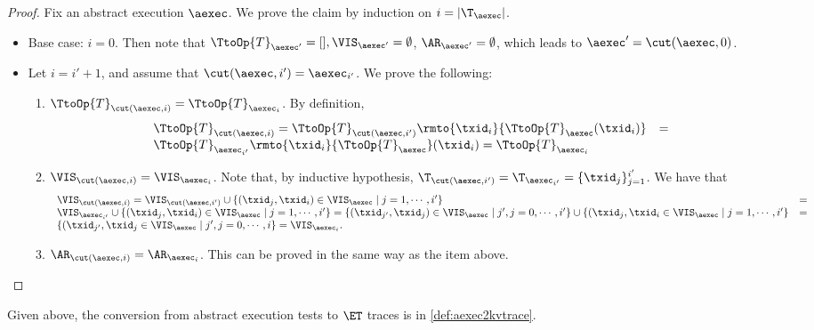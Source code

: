 \begin{proof}
Fix an abstract execution $\aexec$. We prove the claim by induction on $i = \lvert \T_{\aexec} \rvert$.
\begin{itemize}
\item Base case: $i = 0$. Then note that $\TtoOp{T}_{\aexec'} = [], \VIS_{\aexec'} = \emptyset$, 
$\AR_{\aexec'} = \emptyset$, which leads to $\aexec' = \cut(\aexec, 0)$. 
\item Let $i = i' + 1$, and assume that $\cut(\aexec, i') = \aexec_{i'}$. 
We prove the following: 
\begin{enumerate}
\item $\TtoOp{T}_{\cut(\aexec, i)} = \TtoOp{T}_{\aexec_i}$. 
By definition, 
\[
\begin{array}{lr}
\TtoOp{T}_{\cut(\aexec,i)} = \TtoOp{T}_{\cut(\aexec, i')}\rmto{\txid_{i}}{\TtoOp{T}_{\aexec}(\txid_{i})} &= \\
\TtoOp{T}_{\aexec_{i'}}\rmto{\txid_{i}}{\TtoOp{T}_{\aexec}}(\txid_{i}) = \TtoOp{T}_{\aexec_{i}}
\end{array}
\]
\item $\VIS_{\cut(\aexec, i)} = \VIS_{\aexec_{i}}$. 
Note that, by inductive hypothesis, $\T_{\cut(\aexec, i')} = \T_{\aexec_{i'}} = \{\txid_{j}\}_{j=1}^{i'}$. 
We have that  
\[
\begin{array}{lr}
\VIS_{\cut(\aexec, i)} = \VIS_{\cut(\aexec, i')} \cup \{(\txid_j, \txid_{i}) \in \VIS_{\aexec} \mid j = 1,\cdots, i'\} &= \\
\VIS_{\aexec_{i'}} \cup \{(\txid_{j}, \txid_{i}) \in \VIS_{\aexec} \mid j=1,\cdots, i'\} = 
\{(\txid_{j'}, \txid_{j}) \in \VIS_{\aexec} \mid j', j = 0,\cdots, i'\} \cup \{(\txid_{j}, \txid_{i} \in \VIS_{\aexec} \mid j=1,\cdots, i'\} &=\\
\{(\txid_{j'}, \txid_{j} \in \VIS_{\aexec} \mid j',j = 0,\cdots, i\} = \VIS_{\aexec_{i}}.
\end{array}
\]
\item $\AR_{\cut(\aexec, i)} = \AR_{\aexec_{i}}$. This can be proved in the same way 
as the item above. 
\end{enumerate}
\end{itemize}
\end{proof}

Given above, the conversion from abstract execution tests to \( \ET \) traces is in \cref{def:aexec2kvtrace}.


